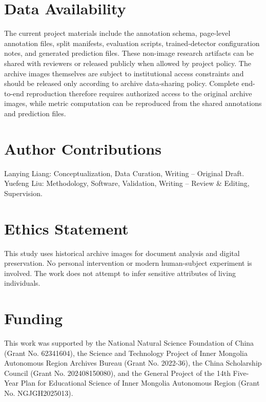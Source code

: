 \documentclass[12pt]{article}
\begin{document}
\section*{Data Availability}
The current project materials include the annotation schema, page-level annotation files, split manifests, evaluation scripts, trained-detector configuration notes, and generated prediction files. These non-image research artifacts can be shared with reviewers or released publicly when allowed by project policy. The archive images themselves are subject to institutional access constraints and should be released only according to archive data-sharing policy. Complete end-to-end reproduction therefore requires authorized access to the original archive images, while metric computation can be reproduced from the shared annotations and prediction files.

\section*{Author Contributions}
Lanying Liang: Conceptualization, Data Curation, Writing -- Original Draft. Yuefeng Liu: Methodology, Software, Validation, Writing -- Review \& Editing, Supervision.

\section*{Ethics Statement}
This study uses historical archive images for document analysis and digital preservation. No personal intervention or modern human-subject experiment is involved. The work does not attempt to infer sensitive attributes of living individuals.

\section*{Funding}
This work was supported by the National Natural Science Foundation of China (Grant No. 62341604), the Science and Technology Project of Inner Mongolia Autonomous Region Archives Bureau (Grant No. 2022-36), the China Scholarship Council (Grant No. 202408150080), and the General Project of the 14th Five-Year Plan for Educational Science of Inner Mongolia Autonomous Region (Grant No. NGJGH2025013).
\end{document}
